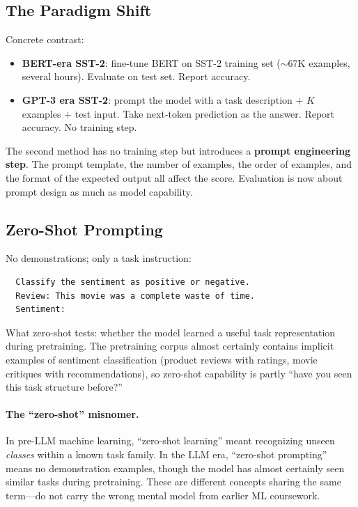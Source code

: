 \subsection{The Paradigm Shift}

Concrete contrast:
\begin{itemize}[nosep]
  \item \textbf{BERT-era SST-2}: fine-tune BERT on SST-2 training set ($\sim$67K examples, several hours). Evaluate on test set. Report accuracy.
  \item \textbf{GPT-3 era SST-2}: prompt the model with a task description + $K$ examples + test input. Take next-token prediction as the answer. Report accuracy. No training step.
\end{itemize}

The second method has no training step but introduces a \textbf{prompt engineering step}. The prompt template, the number of examples, the order of examples, and the format of the expected output all affect the score. Evaluation is now about prompt design as much as model capability.

\subsection{Zero-Shot Prompting}

No demonstrations; only a task instruction:

\begin{verbatim}
  Classify the sentiment as positive or negative.
  Review: This movie was a complete waste of time.
  Sentiment:
\end{verbatim}

What zero-shot tests: whether the model learned a useful task representation during pretraining. The pretraining corpus almost certainly contains implicit examples of sentiment classification (product reviews with ratings, movie critiques with recommendations), so zero-shot capability is partly ``have you seen this task structure before?''

\paragraph{The ``zero-shot'' misnomer.} In pre-LLM machine learning, ``zero-shot learning'' meant recognizing unseen \emph{classes} within a known task family. In the LLM era, ``zero-shot prompting'' means no demonstration examples, though the model has almost certainly seen similar tasks during pretraining. These are different concepts sharing the same term---do not carry the wrong mental model from earlier ML coursework.

